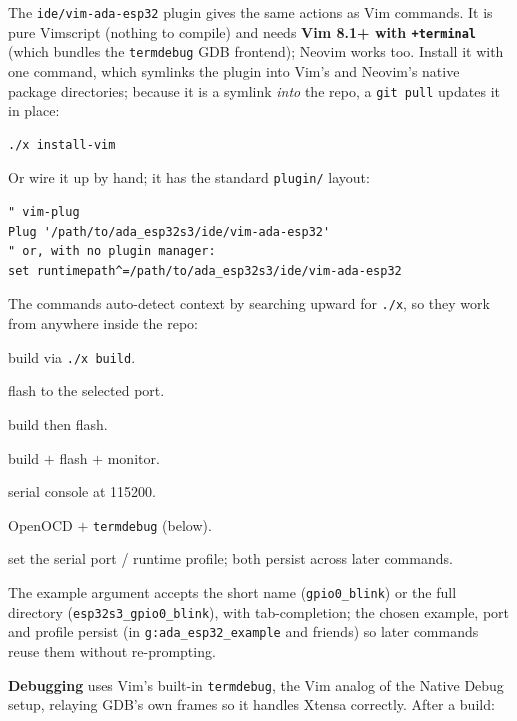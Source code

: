 The \texttt{ide/vim-ada-esp32} plugin gives the same actions as Vim commands. It
is pure Vimscript (nothing to compile) and needs \textbf{Vim 8.1+ with
\texttt{+terminal}} (which bundles the \texttt{termdebug} GDB frontend); Neovim
works too. Install it with one command, which symlinks the plugin into Vim's and
Neovim's native package directories; because it is a symlink \emph{into} the repo,
a \texttt{git pull} updates it in place:

\begin{lstlisting}[style=sh]
./x install-vim
\end{lstlisting}

Or wire it up by hand; it has the standard \texttt{plugin/} layout:

\begin{lstlisting}[style=sh]
" vim-plug
Plug '/path/to/ada_esp32s3/ide/vim-ada-esp32'
" or, with no plugin manager:
set runtimepath^=/path/to/ada_esp32s3/ide/vim-ada-esp32
\end{lstlisting}

The commands auto-detect context by searching upward for \texttt{./x}, so they
work from anywhere inside the repo:

\begin{description}[style=nextline]
\item[{\texttt{:AdaEsp32Build [example]}}] build via \texttt{./x build}.
\item[{\texttt{:AdaEsp32Flash [example]}}] flash to the selected port.
\item[{\texttt{:AdaEsp32BuildFlash [example]}}] build then flash.
\item[{\texttt{:AdaEsp32Run [example]}}] build $+$ flash $+$ monitor.
\item[{\texttt{:AdaEsp32Monitor}}] serial console at 115200.
\item[{\texttt{:AdaEsp32Debug [example]}}] OpenOCD $+$ \texttt{termdebug} (below).
\item[{\texttt{:AdaEsp32Port [port]} / \texttt{:AdaEsp32Profile [prof]}}] set the
  serial port / runtime profile; both persist across later commands.
\end{description}

The example argument accepts the short name (\texttt{gpio0\_blink}) or the full
directory (\texttt{esp32s3\_gpio0\_blink}), with tab-completion; the chosen
example, port and profile persist (in \texttt{g:ada\_esp32\_example} and friends)
so later commands reuse them without re-prompting.

\textbf{Debugging} uses Vim's built-in \texttt{termdebug}, the Vim analog of
the Native Debug setup, relaying GDB's own frames so it handles Xtensa correctly.
After a build:

